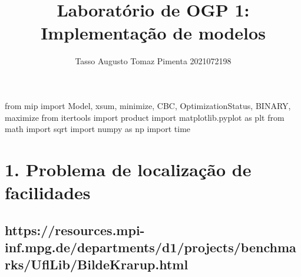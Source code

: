 \documentclass[
  letterpaper,
  DIV=11,
  numbers=noendperiod]{scrartcl}
\title{Laboratório de OGP 1: Implementação de modelos}
\author{Tasso Augusto Tomaz Pimenta 2021072198}
\date{}
\newenvironment{Shaded}{\begin{snugshade}}{\end{snugshade}}
\newcommand{\ImportTok}[1]{\textcolor[rgb]{0.00,0.46,0.62}{#1}}
\newcommand{\NormalTok}[1]{\textcolor[rgb]{0.00,0.23,0.31}{#1}}
\begin{document}
\maketitle


\begin{Shaded}
\begin{Highlighting}[]
\ImportTok{from}\NormalTok{ mip }\ImportTok{import}\NormalTok{ Model, xsum, minimize, CBC, OptimizationStatus, BINARY, maximize}
\ImportTok{from}\NormalTok{ itertools }\ImportTok{import}\NormalTok{ product}
\ImportTok{import}\NormalTok{ matplotlib.pyplot }\ImportTok{as}\NormalTok{ plt}
\ImportTok{from}\NormalTok{ math }\ImportTok{import}\NormalTok{ sqrt}
\ImportTok{import}\NormalTok{ numpy }\ImportTok{as}\NormalTok{ np}
\ImportTok{import}\NormalTok{ time}
\end{Highlighting}
\end{Shaded}

\section{1. Problema de localização de
facilidades}\label{problema-de-localizauxe7uxe3o-de-facilidades}

\subsection{https://resources.mpi-inf.mpg.de/departments/d1/projects/benchmarks/UflLib/BildeKrarup.html}\label{httpsresources.mpi-inf.mpg.dedepartmentsd1projectsbenchmarksufllibbildekrarup.html}
\end{document}
